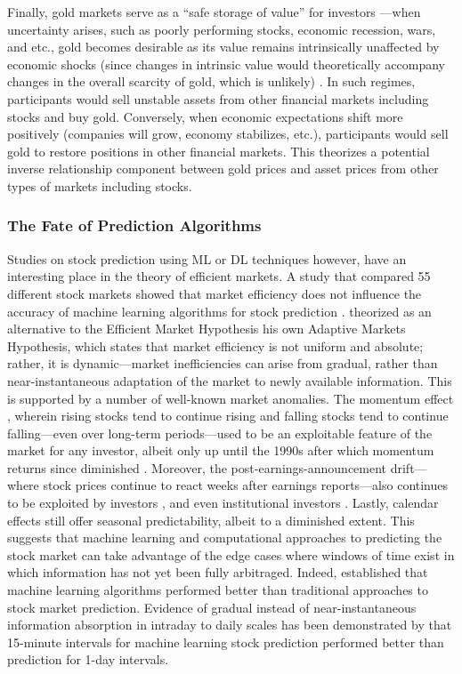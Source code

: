 \documentclass[stu,floatsintext]{apa7}
\begin{document}
Finally, gold markets serve as a ``safe storage of value'' for investors \parencite{ciner2023safe}—when uncertainty arises, such as poorly performing stocks, economic recession, wars, and etc., gold becomes desirable as its value remains intrinsically unaffected by economic shocks (since changes in intrinsic value would theoretically accompany changes in the overall scarcity of gold, which is unlikely) \parencite{baur2010gold}. In such regimes, participants would sell unstable assets from other financial markets including stocks and buy gold. Conversely, when economic expectations shift more positively (companies will grow, economy stabilizes, etc.), participants would sell gold to restore positions in other financial markets. This theorizes a potential inverse relationship component between gold prices and asset prices from other types of markets including stocks.

\subsubsection{The Fate of Prediction Algorithms}

Studies on stock prediction using ML or DL techniques however, have an interesting place in the theory of efficient markets. A study that compared 55 different stock markets showed that market efficiency does not influence the accuracy of machine learning algorithms for stock prediction \parencite{bustos2025machine}. \textcite{lo2004adaptive} theorized as an alternative to the Efficient Market Hypothesis his own Adaptive Markets Hypothesis, which states that market efficiency is not uniform and absolute; rather, it is dynamic—market inefficiencies can arise from gradual, rather than near-instantaneous adaptation of the market to newly available information. This is supported by a number of well-known market anomalies. The momentum effect \parencite{jegadeesh1993returns}, wherein rising stocks tend to continue rising and falling stocks tend to continue falling—even over long-term periods—used to be an exploitable feature of the market for any investor, albeit only up until the 1990s after which momentum returns since diminished \parencite{bhattacharya2015has}. Moreover, the post-earnings-announcement drift—where stock prices continue to react weeks after earnings reports—also continues to be exploited by investors \parencite{bernard1989postearnings}, and even institutional investors \parencite{ke2004do}. Lastly, calendar effects \parencite{zhangcy2020halloween} still offer seasonal predictability, albeit to a diminished extent. This suggests that machine learning and computational approaches to predicting the stock market can take advantage of the edge cases where windows of time exist in which information has not yet been fully arbitraged. Indeed, \parencite{gu2020empirical} established that machine learning algorithms performed better than traditional approaches to stock market prediction. Evidence of gradual instead of near-instantaneous information absorption in intraday to daily scales has been demonstrated by \parencite{khan2023performance} that 15-minute intervals for machine learning stock prediction performed better than prediction for 1-day intervals.
\end{document}
